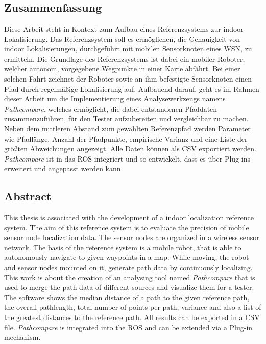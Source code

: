 \chapter*{\abstractname}

\section*{Zusammenfassung}

Diese Arbeit steht in Kontext zum Aufbau eines Referenzsystems zur indoor
Lokalisierung. Das Referenzsystem soll es ermöglichen, die Genauigkeit von
indoor Lokalisierungen, durchgeführt mit mobilen Sensorknoten eines \gls{WSN},
zu ermitteln. Die Grundlage des Referenzsystems ist dabei ein mobiler Roboter,
welcher autonom, vorgegebene Wegpunkte in einer Karte abfährt. Bei einer solchen
Fahrt zeichnet der Roboter sowie an ihm befestigte Sensorknoten einen Pfad
durch regelmäßige Lokalisierung auf. Aufbauend darauf, geht es im Rahmen dieser
Arbeit um die Implementierung eines Analysewerkzeugs namens
\textit{Pathcompare}, welches ermöglicht, die dabei entstandenen Pfaddaten
zusammenzuführen, für den Tester aufzubereiten und vergleichbar zu machen. Neben
dem mittleren Abstand zum gewählten Referenzpfad werden Parameter wie
Pfadlänge, Anzahl der Pfadpunkte, empirische Varianz und eine Liste der größten
Abweichungen angezeigt. Alle Daten können als \gls{CSV} exportiert werden.
\textit{Pathcompare} ist in das \gls{ROS} integriert und so entwickelt, dass es
über Plug-ins erweitert und angepasst werden kann. 



\section*{Abstract} 
This thesis is associated with the development of a indoor
localization reference system. The aim of this reference system is to evaluate
the precision of mobile sensor node localization data. The sensor nodes are
organized in a wireless sensor network. The basis of the reference system is a
mobile robot, that is able to autonomously navigate to given waypoints in a map.
While moving, the robot and sensor nodes mounted on it, generate path data by
continuously localizing. This work is about the creation of an analysing tool
named \textit{Pathcompare} that is used to merge the path data of different
sources and visualize them for a tester. The software shows the median distance
of a path to the given reference path, the overall pathlength, total number of
points per path, variance and also a list of the greatest distances to the
reference path.  All results can be exported in a \gls{CSV} file.
\textit{Pathcompare} is integrated into the \gls{ROS} and can be extended via a
Plug-in mechanism.
